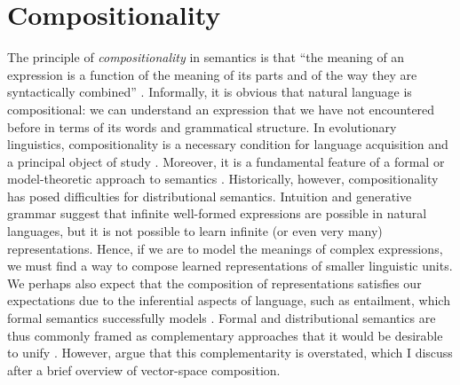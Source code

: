 
\section{Compositionality}
\label{compositionality}

The principle of \emph{compositionality} in semantics is that ``the meaning of an
expression is a function of the meaning of its parts and of the way they are
syntactically combined'' \parencites[153]{Partee2004}.
Informally, it is obvious that natural language is compositional: we can understand an
expression that we have not encountered before in terms of its words and grammatical
structure.
In evolutionary linguistics, compositionality is a necessary condition for language
acquisition and a principal object of study \parencites[e.g.][]{Kirby2017}.
Moreover, it is a fundamental feature of a formal or model-theoretic approach to
semantics \parencites{Montague1974}[153-181]{Partee2004}.
Historically, however, compositionality has posed difficulties for distributional
semantics.
Intuition and generative grammar suggest that infinite well-formed expressions are
possible in natural languages, but it is not possible to learn infinite (or even very
many) representations.
Hence, if we are to model the meanings of complex expressions, we must find a way to
compose learned representations of smaller linguistic units.
We perhaps also expect that the composition of representations satisfies our
expectations due to the inferential aspects of language, such as entailment, which
formal semantics successfully models
\parencites[20-21]{Lenci2008}[620-622]{Boleda2016}.
Formal and distributional semantics are thus commonly framed as complementary
approaches that it would be desirable to unify
\parencites[e.g.][]{Erk2013}{Baroni2014}{Boleda2020}.
However, \textcites{Westera2019} argue that this complementarity is overstated, which I
discuss after a brief overview of vector-space composition.


